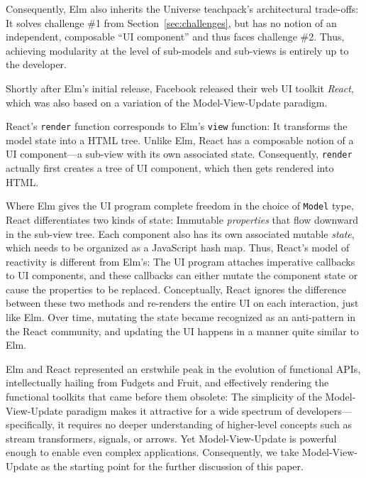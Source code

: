 \documentclass[sigplan,screen]{acmart}
\begin{document}
Consequently, Elm also inherits the Universe teachpack's architectural
trade-offs: It solves challenge \#1 from Section~\ref{sec:challenges},
but has no notion of an
independent, composable ``UI component'' and thus faces challenge \#2.
Thus, achieving modularity
at the level of sub-models and sub-views is entirely up to the
developer.

Shortly after Elm's initial release, Facebook released their web UI
toolkit \textit{React}, which was also based on a variation of the
Model-View-Update paradigm.

React's \texttt{render} function corresponds to Elm's \texttt{view}
function: It transforms the model state into a HTML tree.  Unlike Elm,
React has a composable notion of a UI component---a sub-view with its
own associated state.  Consequently, \texttt{render} actually first
creates a tree of UI component, which then gets rendered into HTML.

Where Elm gives the UI program complete freedom in the choice of
\texttt{Model} type, React differentiates two kinds of state:
Immutable \textit{properties} that flow downward in the sub-view tree.
Each component also has its own associated mutable \textit{state},
which needs to be organized as a JavaScript hash map.
Thus, React's model of reactivity is different from Elm's: The UI
program attaches imperative callbacks to UI components, and these
callbacks can either mutate the component state or cause the
properties to be replaced.  Conceptually, React ignores the difference
between these two methods and re-renders the entire UI on each
interaction, just like Elm.  Over time, mutating the state became
recognized as an anti-pattern in the React community, and updating the
UI happens in a manner quite similar to Elm.


Elm and React represented an erstwhile peak in the evolution of
functional APIs, intellectually hailing from Fudgets and Fruit, and
effectively rendering the functional toolkits that came before them
obsolete: The simplicity of the Model-View-Update paradigm makes it
attractive for a wide spectrum of developers---specifically, it
requires no deeper understanding of higher-level concepts such as
stream transformers, signals, or arrows.  Yet Model-View-Update is
powerful enough to enable even complex applications.  Consequently, we
take Model-View-Update as the starting point for the further
discussion of this paper.

\end{document}
